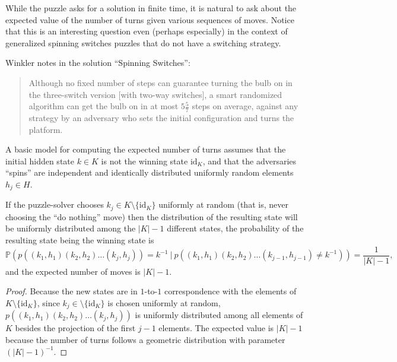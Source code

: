 While the puzzle asks for a solution in finite time,
it is natural to ask about the expected value of the number of turns given
various sequences of moves.
Notice that this is an interesting question even (perhaps especially)
in the context of generalized spinning switches puzzles that do not have a
switching strategy.

Winkler \cite{Winkler2021}
notes in the solution ``Spinning Switches'':
\begin{quote}
  Although no fixed number of steps can guarantee turning the bulb on in the
  three-switch version [with two-way switches],
  a smart randomized algorithm can get the bulb on in at most $5 \frac{5}{7}$
  steps on average, against any strategy by an adversary who sets the initial
  configuration and turns the platform. \cite{Winkler2021}
\end{quote}

%

%
A basic model for computing the expected number of turns assumes that
the initial hidden state $k \in K$ is not the winning state $\mathrm{id}_K$,
and that the adversaries ``spins'' are independent and identically distributed
uniformly random elements $h_j \in H$.

\begin{proposition}
  If the puzzle-solver chooses $k_j \in K \setminus \{\mathrm{id}_K\}$ uniformly
  at random (that is, never choosing the ``do nothing'' move)
  then the distribution of the resulting state will be uniformly distributed
  among the $|K| - 1$ different states, the probability of the resulting state
  being the winning state is
  \begin{equation}
    \mathbb{P}(p((k_1, h_1)(k_2, h_2)\dots(k_j, h_j))=k^{-1}\ |\ p((k_1, h_1)(k_2, h_2)\dots(k_{j-1}, h_{j-1})\neq k^{-1})) = \frac{1}{|K| - 1},
  \end{equation} and the expected number of moves is $|K| - 1$.
\label{prop:randomStrategy}
\end{proposition}
\begin{proof}
  Because the new states are in $1$-to-$1$ correspondence with the elements of
  $K \setminus \{\mathrm{id}_K\}$, since $k_j \in \setminus \{\mathrm{id}_K\}$
  is chosen uniformly at random, $p((k_1, h_1)(k_2, h_2)\dots(k_j, h_j))$
  is uniformly distributed among all elements of $K$ besides the projection of
  the first $j-1$ elements.
  The expected value is $|K| - 1$ because the number of turns follows a
  geometric distribution with parameter {$(|K| - 1)^{-1}$}.
\end{proof}

